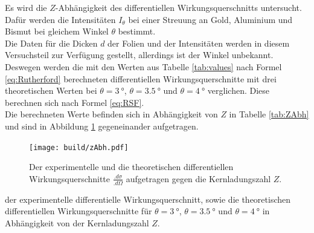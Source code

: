 Es wird die $Z$-Abhängigkeit des differentiellen Wirkungsquerschnitts untersucht. Dafür werden die Intensitäten $I_\theta$ bei einer Streuung an Gold, Aluminium und Bismut bei gleichem Winkel $\theta$ bestimmt.\\
Die Daten für die Dicken $d$ der Folien und der Intensitäten werden in diesem Versuchsteil zur Verfügung gestellt, allerdings ist der Winkel unbekannt. Deswegen werden die mit den Werten aus Tabelle \ref{tab:values} nach Formel \eqref{eq:Rutherford} berechneten differentiellen Wirkungsquerschnitte mit drei theoretischen Werten bei $\theta=\SI{3}{\degree}$, $\theta=\SI{3.5}{\degree}$ und $\theta=\SI{4}{\degree}$ verglichen. Diese berechnen sich nach Formel \eqref{eq:RSF}.\\
Die berechneten Werte befinden sich in Abhängigkeit von $Z$ in Tabelle \ref{tab:ZAbh} und sind in Abbildung \ref{fig:ZAbh} gegeneinander aufgetragen.\\

\begin{figure}
\centering
\texttt{[image: build/zAbh.pdf]}
\caption{Der experimentelle und die theoretischen differentiellen Wirkungsquerschnitte $\frac{.d\sigma}{.d\Omega}$ aufgetragen gegen die Kernladungszahl $Z$.}
\label{fig:ZAbh}
\end{figure}

\begin{table}
	\centering
	\caption{der experimentelle differentielle Wirkungsquerschnitt, sowie die theoretischen differentiellen Wirkungsquerschnitte für $\theta=\SI{3}{\degree}$, $\theta=\SI{3,5}{\degree}$ und $\theta=\SI{4}{\degree}$ in Abhängigkeit von der Kernladungszahl $Z$.}
	
	\label{tab:ZAbh}
\end{table}

